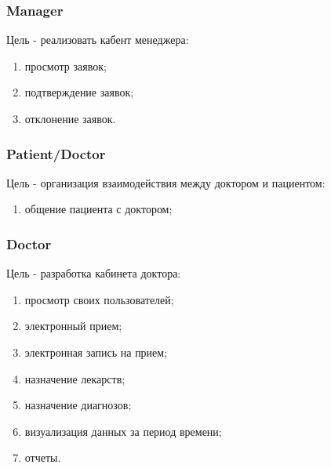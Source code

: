 \subsubsection{Manager}
Цель - реализовать кабент менеджера:
\begin{enumerate}
  \item просмотр заявок;
  \item подтверждение заявок;
  \item отклонение заявок.   
\end{enumerate}

\subsubsection{Patient/Doctor}
Цель - организация взаимодействия между доктором и пациентом:
\begin{enumerate}
  \item общение пациента с доктором;
\end{enumerate}

\subsubsection{Doctor}
Цель - разработка кабинета доктора:
\begin{enumerate}
  \item просмотр своих пользователей;
  \item электронный прием;
  \item электронная запись на прием;
  \item назначение лекарств;
  \item назначение диагнозов;
  \item визуализация данных за период времени;
  \item отчеты.
\end{enumerate}

